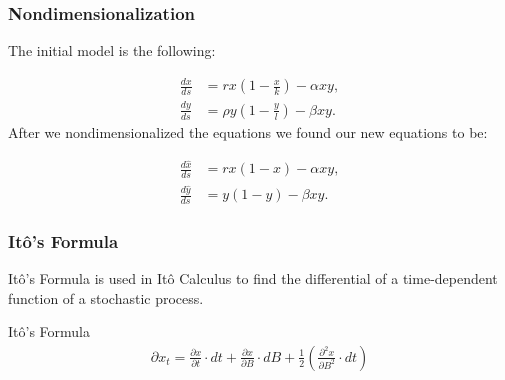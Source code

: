 \documentclass{beamer}
\begin{document}
\begin{frame}
\frametitle{Nondimensionalization}

The initial model is the following:

  \begin{align*}
    \frac{dx}{ds} & = rx \left(1-\frac{x}{k}\right) - \alpha xy, \\
    \frac{dy}{ds} & = \rho y \left(1-\frac{y}{l}\right) - \beta xy.
  \end{align*}
After we nondimensionalized the equations we found our new equations to be:

	\begin{align*}
		\frac{d\hat{x}}{ds} &= rx(1-x) - \alpha xy, \\
		\frac{d\hat{y}}{ds} &= y(1-y) - \beta xy.
	\end{align*}
\end{frame}



\begin{frame}
\frametitle{It\^o's Formula}
It\^o's Formula is used in It\^o Calculus to find the differential of a time-dependent function of a stochastic process.

		 \begin{block}{It\^o's Formula}
      \begin{align*}
				\partial x_t = \frac{\partial x}{\partial t} \cdot dt + \frac{\partial x}{\partial B} \cdot dB + \frac{1}{2} \left(\frac{\partial ^2 x}{\partial B ^2} \cdot dt\right)
			\end{align*}
    \end{block}
		
\end{frame}
\end{document}

